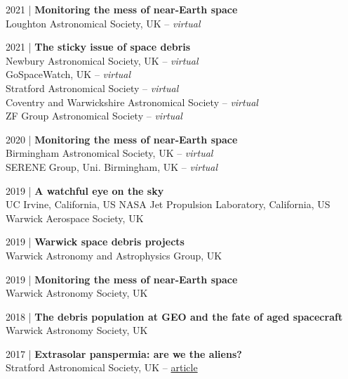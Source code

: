 \documentclass[10pt,a4paper]{altacv}
\begin{document}
\smallskip

\small 2021 | \textbf{Monitoring the mess of near-Earth space} \\
Loughton Astronomical Society, UK -- \textit{virtual}

\smallskip

\small 2021 | \textbf{The sticky issue of space debris} \\
Newbury Astronomical Society, UK -- \textit{virtual} \\
GoSpaceWatch, UK -- \textit{virtual}\\
Stratford Astronomical Society -- \textit{virtual} \\
Coventry and Warwickshire Astronomical Society -- \textit{virtual} \\
ZF Group Astronomical Society -- \textit{virtual}

\smallskip

\small 2020 | \textbf{Monitoring the mess of near-Earth space} \\
Birmingham Astronomical Society, UK -- \textit{virtual} \\
SERENE Group, Uni. Birmingham, UK -- \textit{virtual}

\smallskip

\small 2019 | \textbf{A watchful eye on the sky} \\
UC Irvine, California, US \linebreak
NASA Jet Propulsion Laboratory, California, US \linebreak
Warwick Aerospace Society, UK 

\smallskip

\small 2019 | \textbf{Warwick space debris projects} \\
Warwick Astronomy and Astrophysics Group, UK

\smallskip

\small 2019 | \textbf{Monitoring the mess of near-Earth space} \\
Warwick Astronomy Society, UK

\smallskip

\small 2018 | \textbf{The debris population at GEO and the fate of aged spacecraft} \\
Warwick Astronomy Society, UK

\smallskip

\small 2017 | \textbf{Extrasolar panspermia: are we the aliens?} \\
Stratford Astronomical Society, UK -- \href{http://www.astro.org.uk/news/nov17/}{article}
\end{document}
